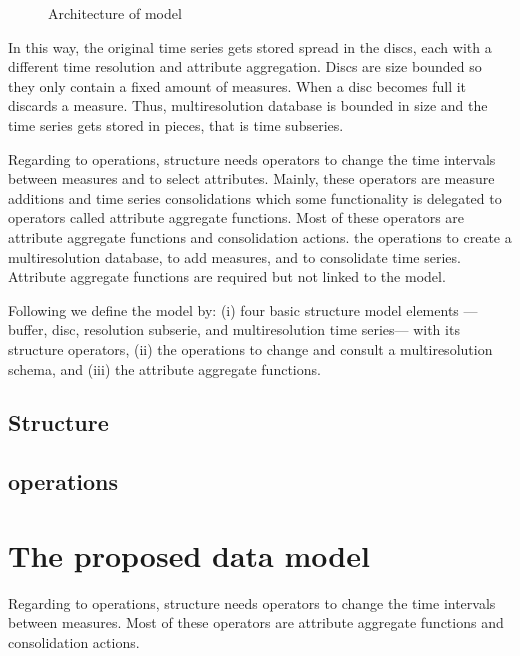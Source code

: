 \begin{figure}[tp]
  \centering
  
  \smallskip
  \caption{Architecture of  model}
  \label{fig:model:mtsdb}
\end{figure}


In this way, the original time series gets stored spread in the discs,
each with a different time resolution and attribute aggregation.
Discs are size bounded so they only contain a fixed amount of
measures. When a disc becomes full it discards a measure. Thus,
multiresolution database is bounded in size and the time series gets
stored in pieces, that is time subseries.

Regarding to operations,  structure needs operators to
change the time intervals between measures and to select
attributes. Mainly, these operators are measure additions and time
series consolidations which some functionality is delegated to operators called 
attribute aggregate functions.
 Most of these operators
are attribute aggregate functions and consolidation actions.
the operations to
create a multiresolution database, to add measures, and to consolidate
time series.
 Attribute aggregate functions are required but not linked
to the model.\todo{}

Following we define the  model by: (i) four basic
structure model elements ---buffer, disc, resolution subserie, and
multiresolution time series--- with its structure operators, (ii) the
operations to change and consult a multiresolution schema, and (iii)
the attribute aggregate functions.



\subsection{Structure}



\subsection{operations}




\section{The proposed data model}



Regarding to operations,  structure needs operators to
change the time intervals between measures. Most of these operators
are attribute aggregate functions and consolidation actions.

